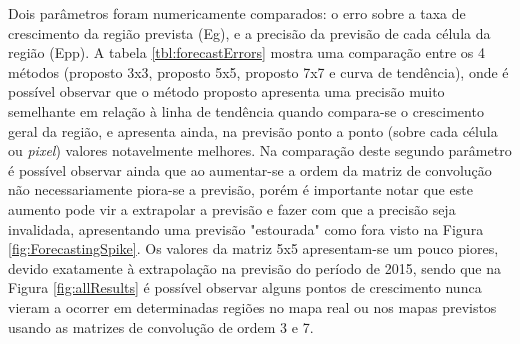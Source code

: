 Dois parâmetros foram numericamente comparados: o erro sobre a taxa de crescimento da região prevista (Eg), e a precisão da previsão de cada célula da região (Epp). A tabela \ref{tbl:forecastErrors} mostra uma comparação entre os 4 métodos (proposto 3x3, proposto 5x5, proposto 7x7 e curva de tendência), onde é possível observar que o método proposto apresenta uma precisão muito semelhante em relação à linha de tendência quando compara-se o crescimento geral da região, e apresenta ainda, na previsão ponto a ponto (sobre cada célula ou \emph{pixel}) valores notavelmente melhores. Na comparação deste segundo parâmetro é possível observar ainda que ao aumentar-se a ordem da matriz de convolução não necessariamente piora-se a previsão, porém é importante notar que este aumento pode vir a extrapolar a previsão e fazer com que a precisão seja invalidada, apresentando uma previsão "estourada" como fora visto na Figura \ref{fig:ForecastingSpike}. Os valores da matriz 5x5 apresentam-se um pouco piores, devido exatamente à extrapolação na previsão do período de 2015, sendo que na Figura \ref{fig:allResults} é possível observar alguns pontos de crescimento nunca vieram a ocorrer em determinadas regiões no mapa real ou nos mapas previstos usando as matrizes de convolução de ordem 3 e 7. 

